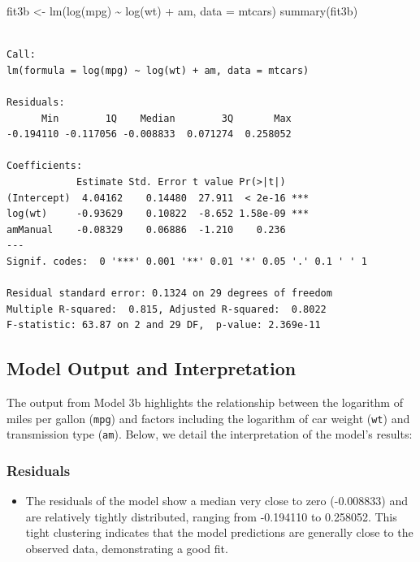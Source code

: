 \documentclass[
  letterpaper,
  DIV=11,
  numbers=noendperiod]{scrreport}
\newenvironment{Shaded}{\begin{snugshade}}{\end{snugshade}}
\newcommand{\AttributeTok}[1]{\textcolor[rgb]{0.40,0.45,0.13}{#1}}
\newcommand{\FunctionTok}[1]{\textcolor[rgb]{0.28,0.35,0.67}{#1}}
\newcommand{\NormalTok}[1]{\textcolor[rgb]{0.00,0.23,0.31}{#1}}
\newcommand{\OtherTok}[1]{\textcolor[rgb]{0.00,0.23,0.31}{#1}}
\newcommand{\SpecialCharTok}[1]{\textcolor[rgb]{0.37,0.37,0.37}{#1}}
\providecommand{\tightlist}{%
  \setlength{\itemsep}{0pt}\setlength{\parskip}{0pt}}\usepackage{longtable,booktabs,array}
\begin{document}
\begin{Shaded}
\begin{Highlighting}[]
\NormalTok{fit3b }\OtherTok{\textless{}{-}} \FunctionTok{lm}\NormalTok{(}\FunctionTok{log}\NormalTok{(mpg) }\SpecialCharTok{\textasciitilde{}} \FunctionTok{log}\NormalTok{(wt) }\SpecialCharTok{+}\NormalTok{ am, }\AttributeTok{data =}\NormalTok{ mtcars)}
\FunctionTok{summary}\NormalTok{(fit3b)}
\end{Highlighting}
\end{Shaded}

\begin{verbatim}

Call:
lm(formula = log(mpg) ~ log(wt) + am, data = mtcars)

Residuals:
      Min        1Q    Median        3Q       Max 
-0.194110 -0.117056 -0.008833  0.071274  0.258052 

Coefficients:
            Estimate Std. Error t value Pr(>|t|)    
(Intercept)  4.04162    0.14480  27.911  < 2e-16 ***
log(wt)     -0.93629    0.10822  -8.652 1.58e-09 ***
amManual    -0.08329    0.06886  -1.210    0.236    
---
Signif. codes:  0 '***' 0.001 '**' 0.01 '*' 0.05 '.' 0.1 ' ' 1

Residual standard error: 0.1324 on 29 degrees of freedom
Multiple R-squared:  0.815, Adjusted R-squared:  0.8022 
F-statistic: 63.87 on 2 and 29 DF,  p-value: 2.369e-11
\end{verbatim}

\subsection{Model Output and
Interpretation}\label{model-output-and-interpretation-1}

The output from Model 3b highlights the relationship between the
logarithm of miles per gallon (\texttt{mpg}) and factors including the
logarithm of car weight (\texttt{wt}) and transmission type
(\texttt{am}). Below, we detail the interpretation of the model's
results:

\subsubsection{Residuals}\label{residuals-1}

\begin{itemize}
\tightlist
\item
  The residuals of the model show a median very close to zero
  (-0.008833) and are relatively tightly distributed, ranging from
  -0.194110 to 0.258052. This tight clustering indicates that the model
  predictions are generally close to the observed data, demonstrating a
  good fit.
\end{itemize}
\end{document}
